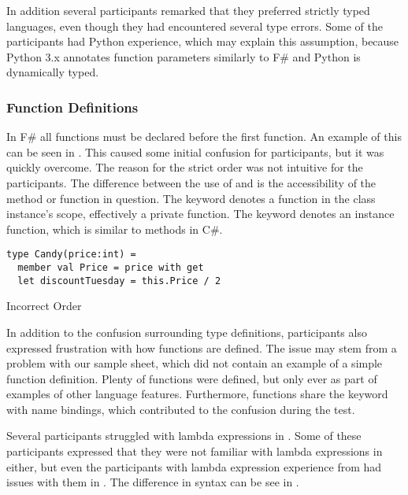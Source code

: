 In addition several participants remarked that they preferred strictly typed languages, even though they had encountered several type errors. Some of the participants had Python experience, which may explain this assumption, because Python 3.x annotates function parameters similarly to F\# and Python is dynamically typed.

\subsubsection{Function Definitions}
In F\# all  functions must be declared before the first  function. An example of this can be seen in . This caused some initial confusion for participants, but it was quickly overcome. The reason for the strict order was not intuitive for the participants. The difference between the use of  and  is the accessibility of the method or function in question. The  keyword denotes a function in the class instance's scope, effectively a private function. The  keyword denotes an instance function, which is similar to methods in C\#.

\begin{listing}[H]
\begin{verbatim}
type Candy(price:int) =
  member val Price = price with get
  let discountTuesday = this.Price / 2
\end{verbatim}
\caption{Incorrect Order}
\label{lst:let-mem-incor}
\end{listing}

In addition to the confusion surrounding type definitions, participants also expressed frustration with how functions are defined. The issue may stem from a problem with our sample sheet, which did not contain an example of a simple function definition. Plenty of functions were defined, but only ever as part of examples of other language features. Furthermore, functions share the  keyword with name bindings, which contributed to the confusion during the test.

Several participants struggled with lambda expressions in \fs. Some of these participants expressed that they were not familiar with lambda expressions in \cs either, but even the participants with lambda expression experience from \cs had issues with them in \fs. The difference in syntax can be see in .

